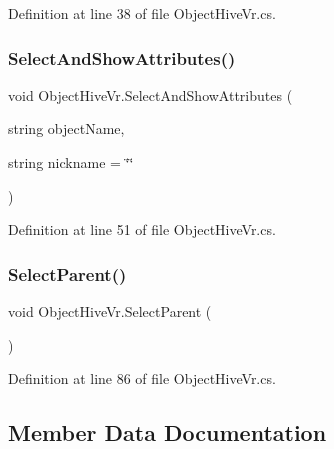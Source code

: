 Definition at line 38 of file Object\+Hive\+Vr.\+cs.

\mbox{\label{class_object_hive_vr_a5b7d838d57f778ac91cc0e666709512f}} 
\subsubsection{\texorpdfstring{SelectAndShowAttributes()}{SelectAndShowAttributes()}}
{\footnotesize\ttfamily void Object\+Hive\+Vr.\+Select\+And\+Show\+Attributes (\begin{DoxyParamCaption}\item[{string}]{object\+Name,  }\item[{string}]{nickname = {\ttfamily \char`\"{}\char`\"{}} }\end{DoxyParamCaption})}



Definition at line 51 of file Object\+Hive\+Vr.\+cs.

\mbox{\label{class_object_hive_vr_aae31b142421654bbc931d81ff784bfad}} 
\subsubsection{\texorpdfstring{SelectParent()}{SelectParent()}}
{\footnotesize\ttfamily void Object\+Hive\+Vr.\+Select\+Parent (\begin{DoxyParamCaption}{ }\end{DoxyParamCaption})}



Definition at line 86 of file Object\+Hive\+Vr.\+cs.



\subsection{Member Data Documentation}
\mbox{\label{class_object_hive_vr_ae93ae57750302e7923144b1ae10d3864}} 
